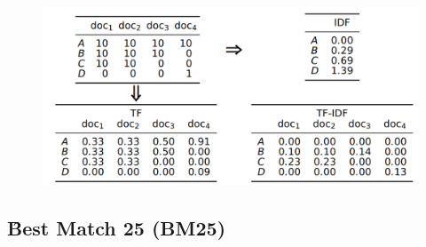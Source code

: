     
    \begin{figure}
        \centering
        \includegraphics[width=1\textwidth]{assets/pics/tf-idf-matriks.png}
        \label{fig:tf-idf-matriks}
    \end{figure}
    \subsection{\f{Best Match 25} (BM25)}
    \label{sec:bm25}
    
